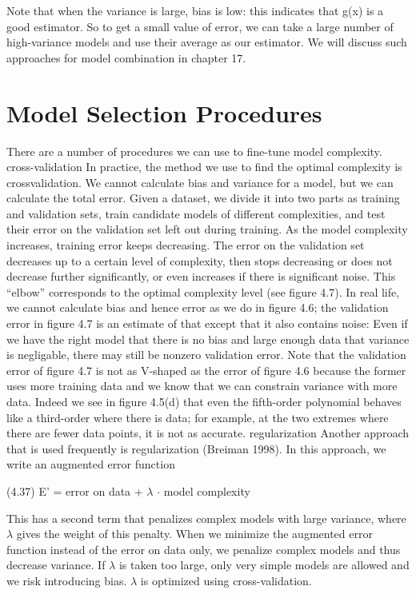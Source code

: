 Note that when the variance is large, bias is low: this indicates that g(x) is a good estimator. So to get a small value of error, we can take a large number of high-variance models and use their average as our estimator. We will discuss such approaches for model combination in chapter 17.

\section{Model Selection Procedures}

There are a number of procedures we can use to fine-tune model complexity. cross-validation In practice, the method we use to find the optimal complexity is crossvalidation. We cannot calculate bias and variance for a model, but we can calculate the total error. Given a dataset, we divide it into two parts as training and validation sets, train candidate models of different complexities, and test their error on the validation set left out during training. As the model complexity increases, training error keeps decreasing. The error on the validation set decreases up to a certain level of complexity, then stops decreasing or does not decrease further significantly, or even increases if there is significant noise. This “elbow” corresponds to the optimal complexity level (see figure 4.7). In real life, we cannot calculate bias and hence error as we do in figure 4.6; the validation error in figure 4.7 is an estimate of that except that it also contains noise: Even if we have the right model that there is no bias and large enough data that variance is negligable, there may still be nonzero validation error. Note that the validation error of figure 4.7 is not as V-shaped as the error of figure 4.6 because the former uses more training data and we know that we can constrain variance with more data. Indeed we see in figure 4.5(d) that even the fifth-order polynomial behaves like a third-order where there is data; for example, at the two extremes where there are fewer data points, it is not as accurate. regularization Another approach that is used frequently is regularization (Breiman 1998). In this approach, we write an augmented error function

(4.37) E' = error on data + $\lambda$ $\cdot$ model complexity

This has a second term that penalizes complex models with large variance, where $\lambda$ gives the weight of this penalty. When we minimize the augmented error function instead of the error on data only, we penalize complex models and thus decrease variance. If $\lambda$ is taken too large, only very simple models are allowed and we risk introducing bias. $\lambda$ is optimized using cross-validation.

